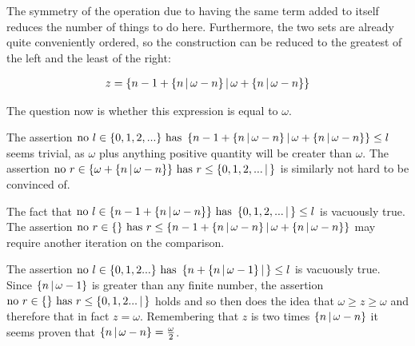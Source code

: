 The symmetry of the operation due to having the same term added to itself reduces the number of things to do here.  Furthermore, the two sets are already quite conveniently ordered, so the construction can be reduced to the greatest of the left and the least of the right:

\begin{align*}
    z = \surreal{n - 1 + \surreal{n}{\omega - n}}{\omega + \surreal{n}{\omega - n}}
\end{align*}

The question now is whether this expression is equal to $\omega$.


The assertion $\surrealgeqright{n - 1 + \surreal{n}{\omega - n}}{\omega + \surreal{n}{\omega - n}}{0, 1, 2, ...}{}$ seems trivial, as $\omega$ plus anything positive quantity will be creater than $\omega$.  The assertion $\surrealgeqleft{n - 1 + \surreal{n}{\omega - n}}{\omega + \surreal{n}{\omega - n}}{0, 1, 2, ...}{}$ is similarly not hard to be convinced of.

The fact that $\surrealgeqright{0, 1, 2, ...}{}{n - 1 + \surreal{n}{\omega - n}}{\omega + \surreal{n}{\omega - n}}$ is vacuously true.  The assertion $\surrealgeqleft{0, 1, 2, ...}{}{n - 1 + \surreal{n}{\omega - n}}{\omega + \surreal{n}{\omega - n}}$ may require another iteration on the comparison.


The assertion $\surrealgeqright{n + \surreal{n}{\omega - 1}}{}{0, 1, 2 ...}{}$ is vacuously true.  Since $\surreal{n}{\omega - 1}$ is greater than any finite number, the assertion $\surrealgeqleft{n + \surreal{n}{\omega - 1}}{}{0, 1, 2 ...}{}$ holds and so then does the idea that $\omega \geq z \geq \omega$ and therefore that in fact $z = \omega$.  Remembering that $z$ is two times $\surreal{n}{\omega - n}$ it seems proven that $\surreal{n}{\omega - n} = \frac{\omega}{2}$.